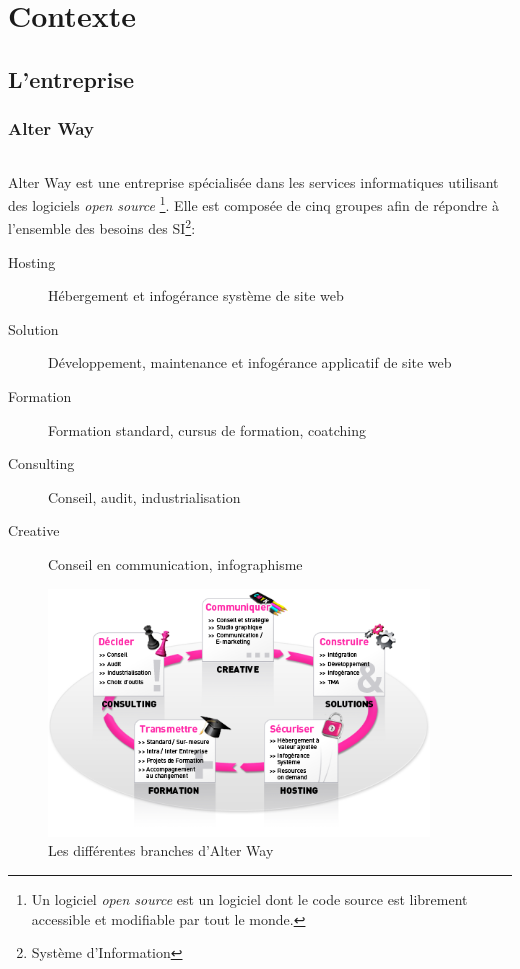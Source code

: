 \part{Contexte}
\chapter{L'entreprise}
\section{Alter Way}
\paragraph*{}
	Alter Way est une entreprise spécialisée dans les services informatiques utilisant des logiciels \emph{open source}
	\footnote{Un logiciel \emph{open source} est un logiciel dont le code source est librement accessible et modifiable par tout le monde.}.
	Elle est composée de cinq groupes afin de répondre à l'ensemble des besoins des SI\footnote{Système d'Information}:
	\begin{description}
		\item[Hosting] Hébergement et infogérance système de site web
		\item[Solution] Développement, maintenance et infogérance applicatif de site web
		\item[Formation] Formation standard, cursus de formation, coatching
		\item[Consulting] Conseil, audit, industrialisation
		\item[Creative] Conseil en communication, infographisme
	\end{description}

	\begin{figure}
	\centering
	\includegraphics[width=0.9\textwidth]{resource/img/aw_360}
	\caption{Les différentes branches d'Alter Way}
	\end{figure}

